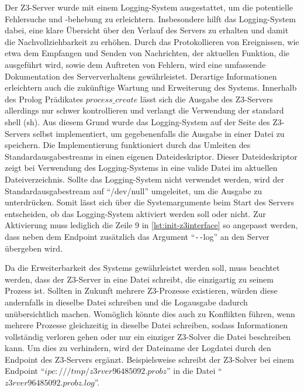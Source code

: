 Der Z3-Server wurde mit einem Logging-System ausgestattet, um die potentielle Fehlersuche und -behebung zu erleichtern.
Insbesondere hilft das Logging-System dabei, eine klare Übersicht über den Verlauf des Servers zu erhalten und damit die Nachvollziehbarkeit zu erhöhen.
Durch das Protokollieren von Ereignissen, wie etwa dem Empfangen und Senden von Nachrichten, der aktuellen Funktion, die ausgeführt wird, sowie dem Auftreten von Fehlern,
wird eine umfassende Dokumentation des Serververhaltens gewährleistet.
Derartige Informationen erleichtern auch die zukünftige Wartung und Erweiterung des Systems.
Innerhalb des Prolog Prädikates $process\_create$ lässt sich die Ausgabe des Z3-Servers allerdings nur schwer kontrollieren und verlangt die Verwendung der standard shell (sh).
Aus diesem Grund wurde das Logging-System auf der Seite des Z3-Servers selbst implementiert, um gegebenenfalls die Ausgabe in einer Datei zu speichern.
Die Implementierung funktioniert durch das Umleiten des Standardausgabestreams in einen eigenen Dateideskriptor.
Dieser Dateideskriptor zeigt bei Verwendung des Logging-Systems in eine valide Datei im aktuellen Dateiverzeichnis.
Sollte das Logging-System nicht verwendet werden, wird der Standardausgabestream auf \enquote{/dev/null} umgeleitet, um die Ausgabe zu unterdrücken.
Somit lässt sich über die Systemargumente beim Start des Servers entscheiden, ob das Logging-System aktiviert werden soll oder nicht.
Zur Aktivierung muss lediglich die Zeile 9 in \cref{lst:init-z3interface} so angepasst werden, dass neben dem Endpoint zusätzlich das Argument \enquote{\texttt{-}\texttt{-}log} an den Server übergeben wird.

Da die Erweiterbarkeit des Systems gewährleistet werden soll, muss beachtet werden, dass der Z3-Server in eine Datei schreibt, die einzigartig zu seinem Prozess ist.
Sollten in Zukunft mehrere Z3-Prozesse existieren, würden diese andernfalls in dieselbe Datei schreiben und die Logausgabe dadurch unübersichtlich machen.
Womöglich könnte dies auch zu Konflikten führen, wenn mehrere Prozesse gleichzeitig in dieselbe Datei schreiben, sodass Informationen vollständig verloren gehen oder nur ein einziger Z3-Solver die Datei beschreiben kann.
Um dies zu verhindern, wird der Dateiname der Logdatei durch den Endpoint des Z3-Servers ergänzt.
Beispielsweise schreibt der Z3-Solver bei einem Endpoint \enquote{$ipc:///tmp/z3rver96485092.probz$} in die Datei \enquote{$z3rver96485092.probz.log$}.



